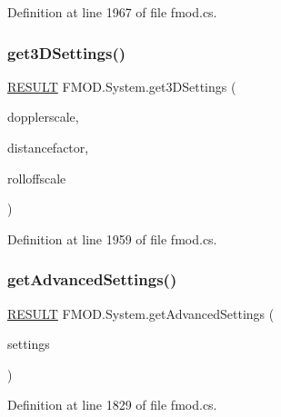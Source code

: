 Definition at line 1967 of file fmod.\+cs.

\mbox{\label{class_f_m_o_d_1_1_system_ad6727352e8d1bc56dc7140d87da33da3}} 
\subsubsection{\texorpdfstring{get3\+D\+Settings()}{get3DSettings()}}
{\footnotesize\ttfamily \hyperlink{namespace_f_m_o_d_a305d1176ef3f8c8815861a60407ac33d}{R\+E\+S\+U\+LT} F\+M\+O\+D.\+System.\+get3\+D\+Settings (\begin{DoxyParamCaption}\item[{out float}]{dopplerscale,  }\item[{out float}]{distancefactor,  }\item[{out float}]{rolloffscale }\end{DoxyParamCaption})}



Definition at line 1959 of file fmod.\+cs.

\mbox{\label{class_f_m_o_d_1_1_system_a6c760457cbe0c3fd59a363cb66367669}} 
\subsubsection{\texorpdfstring{get\+Advanced\+Settings()}{getAdvancedSettings()}}
{\footnotesize\ttfamily \hyperlink{namespace_f_m_o_d_a305d1176ef3f8c8815861a60407ac33d}{R\+E\+S\+U\+LT} F\+M\+O\+D.\+System.\+get\+Advanced\+Settings (\begin{DoxyParamCaption}\item[{ref \hyperlink{struct_f_m_o_d_1_1_a_d_v_a_n_c_e_d_s_e_t_t_i_n_g_s}{A\+D\+V\+A\+N\+C\+E\+D\+S\+E\+T\+T\+I\+N\+GS}}]{settings }\end{DoxyParamCaption})}



Definition at line 1829 of file fmod.\+cs.

\mbox{\label{class_f_m_o_d_1_1_system_aeab3abbecfb26b90e4c6d772fc59dd62}} 
